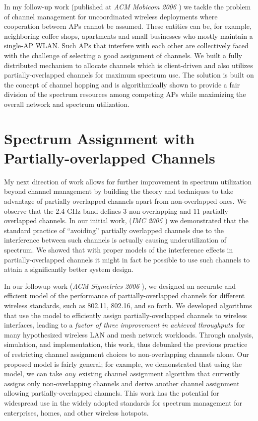 \documentclass[11pt,letterpaper]{article}
\begin{document}
In my follow-up work (published at {\it ACM Mobicom 2006 \cite{mobicom2006}}) we tackle the problem of channel
management for  uncoordinated wireless deployments where cooperation between APs cannot be assumed. These entities can
be, for example, neighboring coffee shops, apartments and small businesses who mostly maintain a single-AP WLAN. Such
APs that interfere with each other are collectively faced with the challenge of selecting a good assignment of channels.
We built a fully distributed mechanism to allocate channels which is client-driven and also utilizes
partially-overlapped channels for maximum spectrum use. The solution is built on the concept of channel hopping and is
algorithmically shown to provide a fair division of the spectrum resources among competing APs while maximizing the
overall network and spectrum utilization.

\section{Spectrum Assignment with Partially-overlapped Channels} My next direction of work allows for further
improvement in spectrum utilization beyond channel management by building the theory and techniques to take advantage of
partially overlapped channels apart from non-overlapped ones.  We observe that the 2.4 GHz band defines 3
non-overlapping and 11 partially overlapped channels. In our initial work, ({\it IMC 2005 \cite{pov}}) we demonstrated that the
standard practice of ``avoiding'' partially overlapped channels due to the interference between such channels is
actually causing underutilization of spectrum.  We showed that with proper models of the interference effects in
partially-overlapped channels it might in fact be possible to use such channels to attain a significantly better system
design.

In our followup work ({\it ACM Sigmetrics 2006 \cite{sigm2006}}), we designed an accurate and efficient model of the performance of
partially-overlapped channels for different wireless standards, such as 802.11, 802.16, and so forth. We developed
algorithms that use the model to efficiently assign partially-overlapped channels to wireless interfaces, leading to a
{\em factor of three improvement in achieved throughputs}\ for many hypothesized wireless LAN and mesh network
workloads. Through analysis, simulation, and implementation, this work, thus debunked the previous practice of
restricting channel assignment choices to non-overlapping channels alone. Our proposed model is fairly general; for
example, we demonstrated that using the model, we can take {\em any}\ existing channel assignment algorithm that
currently assigns only non-overlapping channels and derive another channel assignment allowing partially-overlapped
channels. This work has the potential for widespread use in the widely adopted standards for spectrum management for
enterprises, homes, and other wireless hotspots.
\end{document}
